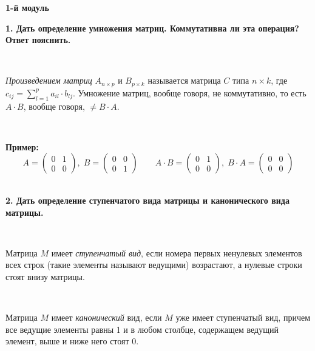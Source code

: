 \documentclass{article}
\begin{document}
	
	\pagestyle{fancy}
	\fancyhead{}
	\fancyhead[C]{\normalsize\color{gray}{Коллоквиум определения, 2019 г.}}
	\fancyhead[R]{\normalsize\color{gray}{vk.com/hse$\_$botai, vk.com/zdarovablin}}
	\fancyhead[L]{\normalsize\color{gray}{ПИ, линейная алгебра}}  
	\fancyfoot[C]{\normalsize\color{gray}{\thepage}}
	\renewcommand{\footrulewidth}{0.1 mm}
	\Large
	\centering
	
	\textbf{1-й модуль}
	
	\flushleft
	\small
	
	\textbf{1. Дать определение умножения матриц. Коммутативна ли эта операция? Ответ пояснить.} 
	
		
	{
		$\;$
		\setlength{\parindent}{0.4cm}
		\hangindent=0.4cm
	
		\textit{Произведением матриц} $A_{n\times p}$ и $B_{p\times k}$ называется матрица $C$ типа $n\times k$, где 
		$c_{ij}=\sum\limits_{l=1}^p a_{il}\cdot b_{lj}$. Умножение матриц, вообще говоря, не коммутативно, то есть $A\cdot B$, вообще говоря, $\ne B\cdot A$.
	
		$\;$
		
		\textbf{Пример:}
		$$
		A=\begin{pmatrix} 
		0 & 1\\ 
		0 & 0 
		\end{pmatrix}, \; B=\begin{pmatrix} 
		0 & 0\\ 
		0 & 1 
		\end{pmatrix}
		\qquad
		A\cdot B=\begin{pmatrix} 
		0 & 1\\ 
		0 & 0 
		\end{pmatrix}, \; B\cdot A=\begin{pmatrix} 
		0 & 0\\ 
		0 & 0 
		\end{pmatrix}$$
		$\;$
		\setlength{\parindent}{0cm}
		\hangindent=0cm
	}
	
	\textbf{2. Дать определение ступенчатого вида матрицы и канонического вида матрицы.} 
	
	{
		$\;$
		\setlength{\parindent}{0.4cm}
		\hangindent=0.4cm
		
		Матрица $M$ имеет \textit{ступенчатый вид}, если номера первых ненулевых элементов всех строк (такие элементы называют ведущими) возрастают, а нулевые строки стоят внизу матрицы. 
		
		$\;$
		
		Матрица $M$ имеет \textit{канонический} вид, если $M$ уже имеет ступенчатый вид, причем все ведущие элементы равны 1 и в любом столбце, содержащем ведущий элемент, выше и ниже него стоят 0.
		
		$\;$
		\setlength{\parindent}{0cm}
		\hangindent=0cm
	}
	
\end{document}
